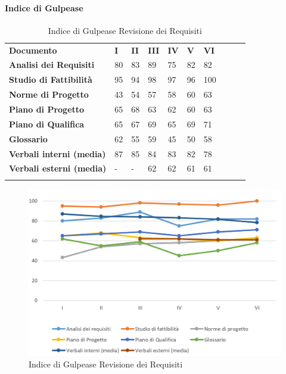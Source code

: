 \paragraph{Indice di Gulpease}\mbox{} %
\begin{longtable} {						
		>{}p{50mm}  		
		>{}p{8mm}		
		>{}p{8mm}		
		>{}p{8mm}		
		>{}p{8mm}		
		>{}p{8mm}		
		>{}p{8mm}
		>{}p{8mm}
		>{}p{8mm}
		>{}p{8mm}				
	}			
	\rowcolor{gray!50}
	\textbf{Documento} & \textbf{I} & \textbf{II} & \textbf{III} & \textbf{IV} & \textbf{V} & \textbf{VI} \TBstrut \\ [2mm]
	\textbf{Analisi dei Requisiti} & 80 & 83 & 89 & 75 & 82 & 82 \TBstrut \\ [2mm]
	\textbf{Studio di Fattibilità} & 95 & 94 & 98 & 97 & 96 & 100 \TBstrut \\ [2mm]
	\textbf{Norme di Progetto} & 43 & 54 & 57 & 58 & 60 & 63 \TBstrut \\ [2mm]
	\textbf{Piano di Progetto} & 65 & 68 & 63 & 62 & 60 & 63 \TBstrut \\ [2mm]
	\textbf{Piano di Qualifica} & 65 & 67 & 69 & 65 & 69 & 71 \TBstrut \\ [2mm]
	\textbf{Glossario} & 62 & 55 & 59 & 45 & 50 & 58 \TBstrut \\ [2mm]
	\textbf{Verbali interni (media)} & 87 & 85 & 84 & 83 & 82 & 78 \TBstrut \\ [2mm]
	\textbf{Verbali esterni (media)} & - & - & 62 & 62 & 61 & 61 \TBstrut \\ [2mm]
	\rowcolor{white}
	\caption{Indice di Gulpease Revisione dei Requisiti}
\end{longtable}
\begin{figure}[H] 	
	\includegraphics[width=\linewidth]{./img/grafici/2.png}	
	\caption{Indice di Gulpease Revisione dei Requisiti}	
\end{figure}

